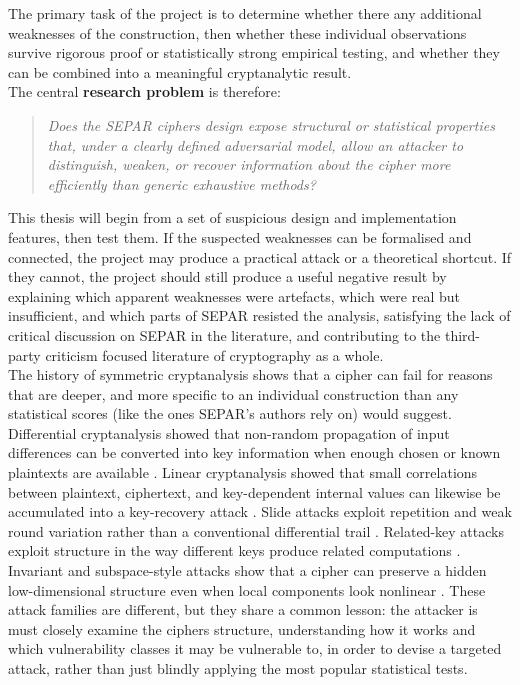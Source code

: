 \documentclass[11pt]{article}
\begin{document}
The primary task of the project is to determine whether there any additional weaknesses of the construction, then whether these individual observations survive rigorous proof or statistically strong empirical testing, and whether they can be combined into a meaningful cryptanalytic result.\\

The central \textbf{research problem} is therefore:

\begin{quote}
\textit{Does the SEPAR ciphers design expose structural or statistical properties that, under a clearly defined adversarial model, allow an attacker to distinguish, weaken, or recover information about the cipher more efficiently than generic exhaustive methods?}
\end{quote}

This thesis will begin from a set of suspicious design and implementation features, then test them. If the suspected weaknesses can be formalised and connected, the project may produce a practical attack or a theoretical shortcut. If they cannot, the project should still produce a useful negative result by explaining which apparent weaknesses were artefacts, which were real but insufficient, and which parts of SEPAR resisted the analysis, satisfying the lack of critical discussion on SEPAR in the literature, and contributing to the third-party criticism focused literature of cryptography as a whole.\\

The history of symmetric cryptanalysis shows that a cipher can fail for reasons that are deeper, and more specific to an individual construction than any statistical scores (like the ones SEPAR's authors rely on) would suggest. Differential cryptanalysis showed that non-random propagation of input differences can be converted into key information when enough chosen or known plaintexts are available \cite{BihamShamir1991,Heys2002}. Linear cryptanalysis showed that small correlations between plaintext, ciphertext, and key-dependent internal values can likewise be accumulated into a key-recovery attack \cite{Matsui1993,MatsuiYamagishi1992}. Slide attacks exploit repetition and weak round variation rather than a conventional differential trail \cite{BiryukovWagner1999}. Related-key attacks exploit structure in the way different keys produce related computations \cite{Biham1994}. Invariant and subspace-style attacks show that a cipher can preserve a hidden low-dimensional structure even when local components look nonlinear \cite{Guo2016}. These attack families are different, but they share a common lesson: the attacker is must closely examine the ciphers structure, understanding how it works and which vulnerability classes it may be vulnerable to, in order to devise a targeted attack, rather than just blindly applying the most popular statistical tests.\\
\end{document}
